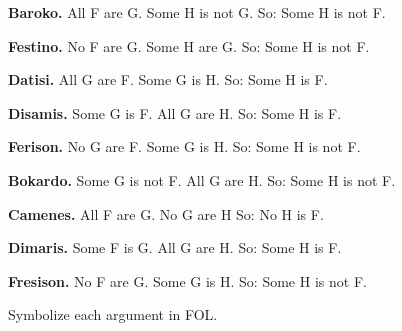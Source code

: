 \begin{earg}
	\item \textbf{Baroko.} All F are G. Some H is not G. So: Some H is not F.
	\item[] 
	\item \textbf{Festino.} No F are G. Some H are G. So: Some H is not F.
	\item[] 
	\item \textbf{Datisi.} All G are F. Some G is H. So: Some H is F.
	\item[] 
	\item \textbf{Disamis.} Some G is F. All G are H. So: Some H is F.
	\item[] 
	\item \textbf{Ferison.} No G are F. Some G is H. So: Some H is not F.
	\item[] 
	\item \textbf{Bokardo.} Some G is not F. All G are H. So:  Some H is not F.
	\item[] 
	\item \textbf{Camenes.} All F are G. No G are H So: No H is F.
	\item[] 
	\item \textbf{Dimaris.} Some F is G. All G are H. So: Some H is F.
	\item[] 
	\item \textbf{Fresison.} No F are G. Some G is H. So: Some H is not F.
	\item[] 
\end{earg}
Symbolize each argument in FOL.

